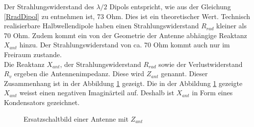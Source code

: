 Der Strahlungswiderstand des $\lambda/2$ Dipols entspricht, wie aus der Gleichung \ref{RradDipol} zu entnehmen ist, 73 Ohm. Dies ist ein theoretischer Wert. Technisch realisierbare Halbwellendipole haben einen Strahlungswiderstand $R_{rad}$ kleiner als 70 Ohm. Zudem kommt  ein von der  Geometrie der Antenne abhängige Reaktanz $X_{ant}$ hinzu. Der Strahlungswiderstand von ca. 70 Ohm kommt auch nur im Freiraum zustande.\\
Die Reaktanz $X_{ant}$,  der Strahlungswiderstand $R_{rad}$ sowie der Verlustwiderstand $R_v$ ergeben die Antennenimpedanz. Diese wird $Z_{ant}$  genannt. Dieser Zusammenhang ist  in der Abbildung \ref{fig:ESBantenneZant} gezeigt. Die in der Abbildung \ref{fig:ESBantenneZant} gezeigte $X_{ant}$ weisst einen negativen Imaginärteil auf. Deshalb ist $X_{ant}$ in Form eines Kondensators gezeichnet.

\begin{figure}[!ht]%
	\begin{center}
	\end{center}
\caption{Ersatzschaltbild einer Antenne mit $Z_{ant}$}
\label{fig:ESBantenneZant}
\end{figure}



